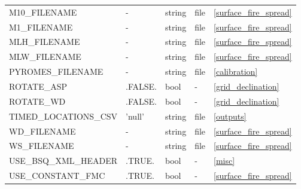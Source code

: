 \begin{landscape}
\begin{center}
\begin{longtable}{lllll}
M10\_FILENAME                                & -                          & string                 & file                               & \ref{surface_fire_spread}            \\
M1\_FILENAME                                 & -                          & string                 & file                               & \ref{surface_fire_spread}            \\
MLH\_FILENAME                                & -                          & string                 & file                               & \ref{surface_fire_spread}            \\
MLW\_FILENAME                                & -                          & string                 & file                               & \ref{surface_fire_spread}            \\
PYROMES\_FILENAME                            & -                          & string                 & file                               & \ref{calibration}                    \\
ROTATE\_ASP                                  & .FALSE.                    & bool                   & -                                  & \ref{grid_declination}               \\
ROTATE\_WD                                   & .FALSE.                    & bool                   & -                                  & \ref{grid_declination}               \\
TIMED\_LOCATIONS\_CSV                        & 'null'                     & string                 & file                               & \ref{outputs}                        \\
WD\_FILENAME                                 & -                          & string                 & file                               & \ref{surface_fire_spread}            \\
WS\_FILENAME                                 & -                          & string                 & file                               & \ref{surface_fire_spread}            \\
USE\_BSQ\_XML\_HEADER                        & .TRUE.                     & bool                   & -                                  & \ref{misc}                           \\
USE\_CONSTANT\_FMC                           & .TRUE.                     & bool                   & -                                  & \ref{surface_fire_spread}            \\

\end{longtable}
\end{center}
\end{landscape}
